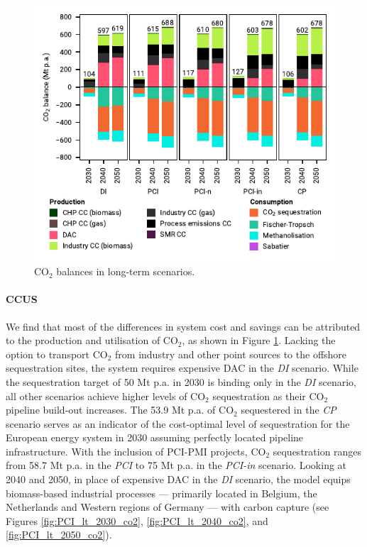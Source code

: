 \documentclass[pdflatex,sn-nature]{sn-jnl}%
\theoremstyle{thmstyleone}%
\theoremstyle{thmstyletwo}%
\theoremstyle{thmstylethree}%
\begin{document}
\begin{figure}[htbp]
  \centering
  \includegraphics{figures/balances_overview_co2 stored}
  \caption{CO$_2$ balances in long-term scenarios.}
  \label{fig:balances_overview_co2_stored}
\end{figure}

\paragraph{CCUS}\label{sec:ccus}
We find that most of the differences in system cost and savings can be attributed to the production and utilisation of CO$_2$, as shown in Figure \ref{fig:balances_overview_co2_stored}. Lacking the option to transport CO$_2$ from industry and other point sources to the offshore sequestration sites, the system requires expensive DAC in the \textit{DI} scenario. While the sequestration target of 50 Mt p.a. in 2030 is binding only in the \textit{DI} scenario, all other scenarios achieve higher levels of CO$_2$ sequestration as their CO$_2$ pipeline build-out increases. 
The 53.9 Mt p.a. of CO$_2$ sequestered in the \textit{CP} scenario serves as an indicator of the cost-optimal level of sequestration for the European energy system in 2030 assuming perfectly located pipeline infrastructure. With the inclusion of PCI-PMI projects, CO$_2$ sequestration ranges from 58.7 Mt p.a. in the \textit{PCI} to 75 Mt p.a. in the \textit{PCI-in} scenario. 
Looking at 2040 and 2050, in place of expensive DAC in the \textit{DI} scenario, the model equips biomass-based industrial processes --- primarily located in Belgium, the Netherlands and Western regions of Germany --- with carbon capture (see Figures \ref{fig:PCI_lt_2030_co2}, \ref{fig:PCI_lt_2040_co2}, and \ref{fig:PCI_lt_2050_co2}). 
\end{document}
